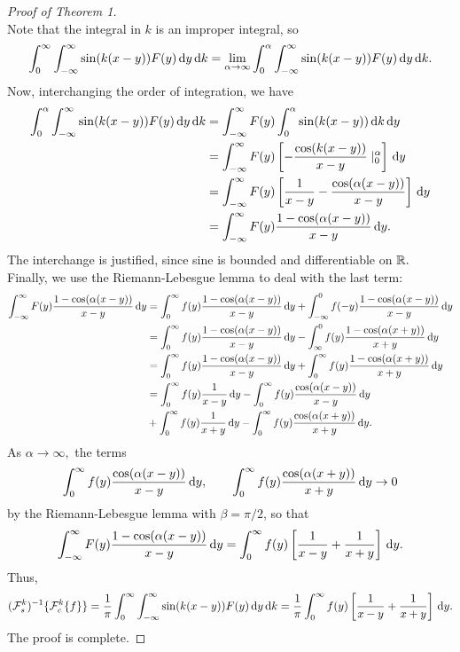 \documentclass[10pt,reqno,oneside,a4paper]{article}
\begin{document}
\begin{proof}[Proof of Theorem 1]
\[\]
Note that the integral in $k$ is an improper integral, so
\[
\int^{\infty}_0 \int_{-\infty}^\infty \sin(k(x-y)) F(y) \,\mathrm{d} y \,\mathrm{d} k = \lim_{\alpha \to \infty} \int^{\alpha}_0 \int_{-\infty}^\infty \sin(k(x-y)) F(y) \,\mathrm{d} y \,\mathrm{d} k.
\]
Now, interchanging the order of integration, we have 
\begin{align*}
\int^{\alpha}_0 \int_{-\infty}^\infty \sin(k(x-y)) F(y) \,\mathrm{d} y \,\mathrm{d} k &= \int_{-\infty}^\infty F(y) \int^{\alpha}_0  \sin(k(x-y)) \,\mathrm{d} k  \,\mathrm{d} y \\
&= \int_{-\infty}^\infty F(y) \left[ - \frac{\cos(k(x-y))}{x-y} \mid^\alpha_0 \right] \,\mathrm{d} y \\
&= \int_{-\infty}^\infty F(y) \left[ \frac{1}{x-y} - \frac{\cos(\alpha(x-y))}{x-y} \right] \,\mathrm{d} y \\
&= \int_{-\infty}^\infty F(y)  \frac{1 - \cos(\alpha(x-y))}{x-y} \,\mathrm{d} y.
\end{align*}
The interchange is justified, since sine is bounded and differentiable on $\mathbb R.$ Finally, we use the Riemann-Lebesgue lemma to deal with the last term:
\begin{align*}
\int_{-\infty}^\infty F(y)  \frac{1 - \cos(\alpha(x-y))}{x-y} \,\mathrm{d} y &= \int_0^\infty f(y)  \frac{1 - \cos(\alpha(x-y))}{x-y} \,\mathrm{d} y + \int_{-\infty}^0 f(-y)  \frac{1 - \cos(\alpha(x-y))}{x-y} \,\mathrm{d} y \\
&= \int_0^\infty f(y)  \frac{1 - \cos(\alpha(x-y))}{x-y} \,\mathrm{d} y - \int_{\infty}^0 f(y)  \frac{1 - \cos(\alpha(x+y))}{x+y} \,\mathrm{d} y \\
&= \int_0^\infty f(y)  \frac{1 - \cos(\alpha(x-y))}{x-y} \,\mathrm{d} y + \int^{\infty}_0 f(y)  \frac{1 - \cos(\alpha(x+y))}{x+y} \,\mathrm{d} y \\ 
&= \int_0^\infty f(y)  \frac{1}{x-y} \,\mathrm{d} y - \int_0^\infty f(y) \frac{\cos(\alpha(x-y))}{x-y} \,\mathrm{d} y \\
&+ \int^{\infty}_0 f(y) \frac{1}{x+y} \,\mathrm{d} y - \int^{\infty}_0 f(y) \frac{\cos(\alpha(x+y))}{x+y} \,\mathrm{d} y.
\end{align*}
As $\alpha \to \infty,$ the terms 
\[ \int_0^\infty f(y) \frac{\cos(\alpha(x-y))}{x-y} \,\mathrm{d} y, \qquad \int^{\infty}_0 f(y) \frac{\cos(\alpha(x+y))}{x+y} \,\mathrm{d} y \to 0\]
by the Riemann-Lebesgue lemma with $\beta = \pi/2$, so that 
\[ 
\int_{-\infty}^\infty F(y) \frac{1 - \cos(\alpha(x-y))}{x-y} \,\mathrm{d} y = \int_0^\infty f(y) \left[ \frac{1}{x-y} + \frac{1}{x+y} \right] \,\mathrm{d} y. 
\]
Thus, 
\[ (\mathcal{F}^k_s)^{-1} \{ \mathcal{F}^k_c \{ f \} \} = \frac{1}{\pi} \int^{\infty}_0 \int_{-\infty}^\infty \sin(k(x-y)) F(y) \,\mathrm{d} y \,\mathrm{d} k = \frac{1}{\pi} \int_0^\infty f(y) \left[ \frac{1}{x-y} + \frac{1}{x+y} \right] \,\mathrm{d} y. \]
The proof is complete.
\end{proof}
\end{document}
